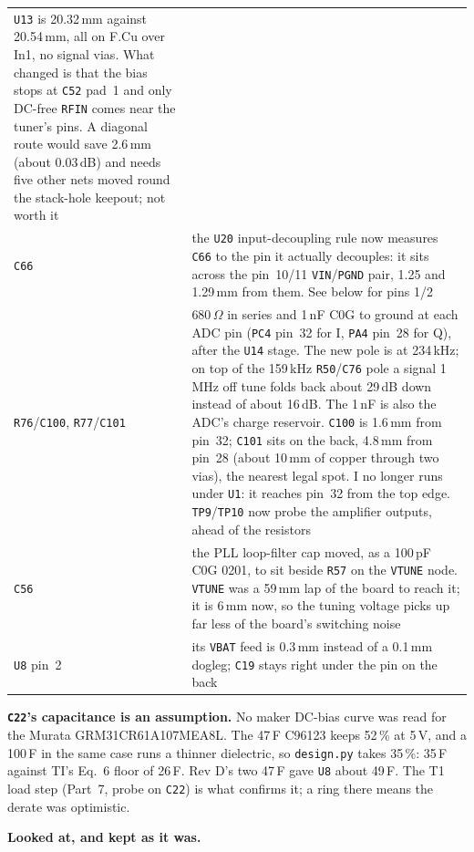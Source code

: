 \documentclass[11pt,a4paper]{article}
\newcommand{\file}[1]{\texttt{\small #1}}
\newcommand{\flag}[1]{\textcolor{warnred}{\textbf{#1}}}
\begin{document}
\begin{center}
\begin{tabular}{@{}P{0.18\textwidth}P{0.72\textwidth}@{}}
\file{U13} is 20.32\,mm against 20.54\,mm, all on F.Cu over In1, no signal vias. What changed
is that the bias stops at \file{C52} pad~1 and only DC-free \file{RFIN} comes near the tuner's
pins. A diagonal route would save 2.6\,mm (about 0.03\,dB) and needs five other nets moved
round the stack-hole keepout; not worth it \\
\file{C66} & the \file{U20} input-decoupling rule now measures \file{C66} to the pin it
actually decouples: it sits across the pin~10/11 \file{VIN}/\file{PGND} pair, 1.25 and
1.29\,mm from them. See below for pins 1/2 \\
\file{R76}/\file{C100}, \file{R77}/\file{C101} & 680\,$\Omega$ in series and 1\,nF C0G to ground at
each ADC pin (\file{PC4} pin~32 for I, \file{PA4} pin~28 for Q), after the \file{U14} stage. The
new pole is at 234\,kHz; on top of the 159\,kHz \file{R50}/\file{C76} pole a signal 1\,MHz off
tune folds back about 29\,dB down instead of about 16\,dB. The 1\,nF is also the ADC's charge
reservoir. \file{C100} is 1.6\,mm from pin~32; \file{C101} sits on the back, 4.8\,mm from
pin~28 (about 10\,mm of copper through two vias), the nearest legal spot. I no longer runs
under \file{U1}: it reaches pin~32 from the top edge. \file{TP9}/\file{TP10} now probe the
amplifier outputs, ahead of the resistors \\
\file{C56} & the PLL loop-filter cap moved, as a 100\,pF C0G 0201, to sit beside \file{R57} on the
\file{VTUNE} node. \file{VTUNE} was a 59\,mm lap of the board to reach it; it is 6\,mm now, so the
tuning voltage picks up far less of the board's switching noise \\
\file{U8} pin~2 & its \file{VBAT} feed is 0.3\,mm instead of a 0.1\,mm dogleg; \file{C19} stays right
under the pin on the back \\
\bottomrule
\end{tabular}
\end{center}

\flag{\file{C22}'s capacitance is an assumption.} No maker DC-bias curve was read for the
Murata GRM31CR61A107MEA8L. The 47\,\textmu F C96123 keeps 52\,\% at 5\,V, and a 100\,\textmu F
in the same case runs a thinner dielectric, so \file{design.py} takes 35\,\%: 35\,\textmu F
against TI's Eq.~6 floor of 26\,\textmu F. Rev D's two 47\,\textmu F gave \file{U8} about
49\,\textmu F. The T1 load step (Part~7, probe on \file{C22}) is what confirms it; a ring
there means the derate was optimistic.

\textbf{Looked at, and kept as it was.}
\end{document}
